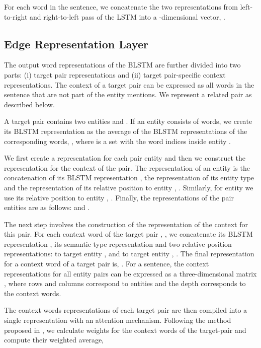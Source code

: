 \documentclass[11pt,a4paper]{article}
\begin{document}
	For each word  in the sentence, we concatenate the two representations from left-to-right and right-to-left pass of the LSTM into a -dimensional vector, .
	
\subsection{Edge Representation Layer}
    
	The output word representations of the BLSTM are further divided into two parts: (i) target pair representations and (ii) target pair-specific context representations. 
	The context of a target pair can be expressed as all words in the sentence that are not part of the entity mentions. 
	We represent a related pair as described below.

	A target pair contains two entities  and . 
    If an entity consists of  words, we create its BLSTM representation as the average of the BLSTM representations of the corresponding words, 
    , where  is a set with the word indices inside entity .
    
    We first create a representation for each pair entity and then we construct the representation for the context of the pair.
     The representation of an entity  is the concatenation of its BLSTM representation , the representation of its entity type  and the representation of its relative position to entity , . 
     Similarly, for entity  we use its relative position to entity , .
     Finally, the representations of the pair entities are as follows:
      and 
	 . 
    
	The next step involves the construction of the representation of the context for this pair.
    For each context word  of the target pair , , we concatenate its BLSTM representation , its semantic type representation  and two relative position representations: to target entity ,  and to target entity , .
    The final representation for a context word  of a target pair is,
    .
    For a sentence, the context representations for all entity pairs can be expressed as a three-dimensional matrix , where rows and columns correspond to entities and the depth corresponds to the context words.
    
The context words representations of each target pair are then compiled into a single representation with an attention mechanism. 
	Following the method proposed in \citet{zhou2016attention}, we calculate weights for the context words of the target-pair and compute their weighted average,
	
\end{document}
